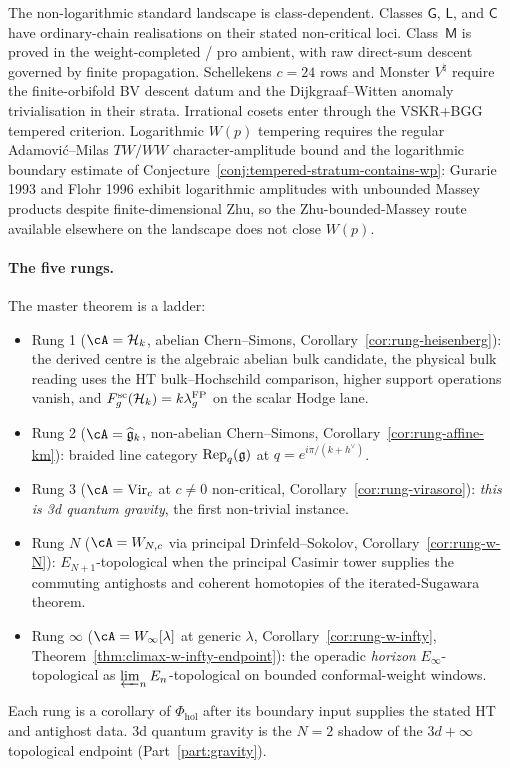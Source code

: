 The non-logarithmic standard landscape is class-dependent. Classes
$\mathsf G$, $\mathsf L$, and $\mathsf C$ have ordinary-chain
realisations on their stated non-critical loci. Class~$\mathsf M$
is proved in the weight-completed / pro ambient, with raw
direct-sum descent governed by finite propagation. Schellekens
$c=24$ rows and Monster $V^\natural$ require the finite-orbifold BV
descent datum and the Dijkgraaf--Witten anomaly trivialisation in
their strata. Irrational cosets enter through the VSKR+BGG
tempered criterion.
Logarithmic $W(p)$ tempering requires the regular
Adamovi\'c--Milas $TW/WW$ character-amplitude bound and the logarithmic
boundary estimate of
Conjecture~\ref{conj:tempered-stratum-contains-wp}: Gurarie 1993
and Flohr 1996 exhibit logarithmic amplitudes with unbounded Massey
products despite finite-dimensional Zhu, so the Zhu-bounded-Massey
route available elsewhere on the landscape does not close $W(p)$.

\paragraph{The five rungs.}
The master theorem is a ladder:
\begin{itemize}\setlength\itemsep{2pt}
\item Rung 1 ($\cA = \cH_k$, abelian Chern--Simons,
 Corollary~\ref{cor:rung-heisenberg}): the derived centre is the
 algebraic abelian bulk candidate, the physical bulk reading uses the
 HT bulk--Hochschild comparison, higher support operations vanish, and
 \(F_g^{\mathrm{sc}}(\mathcal{H}_k)=k\lambda_g^{\mathrm{FP}}\) on the scalar
 Hodge lane.
\item Rung 2 ($\cA = \widehat{\fg}_k$, non-abelian Chern--Simons,
 Corollary~\ref{cor:rung-affine-km}): braided line category
 $\mathrm{Rep}_q(\mathfrak{g})$ at $q = e^{i\pi/(k+h^\vee)}$.
\item Rung 3 ($\cA = \mathrm{Vir}_c$ at $c \neq 0$ non-critical,
 Corollary~\ref{cor:rung-virasoro}): \emph{this is 3d quantum
 gravity}, the first non-trivial instance.
\item Rung $N$ ($\cA = W_{N,c}$ via principal Drinfeld--Sokolov,
 Corollary~\ref{cor:rung-w-N}): $E_{N+1}$-topological when the
 principal Casimir tower supplies the commuting antighosts and
 coherent homotopies of the iterated-Sugawara theorem.
\item Rung $\infty$ ($\cA = W_\infty[\lambda]$ at generic
 $\lambda$, Corollary~\ref{cor:rung-w-infty},
 Theorem~\ref{thm:climax-w-infty-endpoint}): the operadic
 \emph{horizon} $E_\infty$-topological as
 $\varprojlim_n E_n$-topological on bounded conformal-weight
 windows.
\end{itemize}
Each rung is a corollary of $\Phi_{\mathrm{hol}}$ after its
boundary input supplies the stated HT and antighost data. 3d
quantum gravity is the $N = 2$ shadow of the $3d{+}\infty$
topological endpoint
(Part~\ref{part:gravity}).

